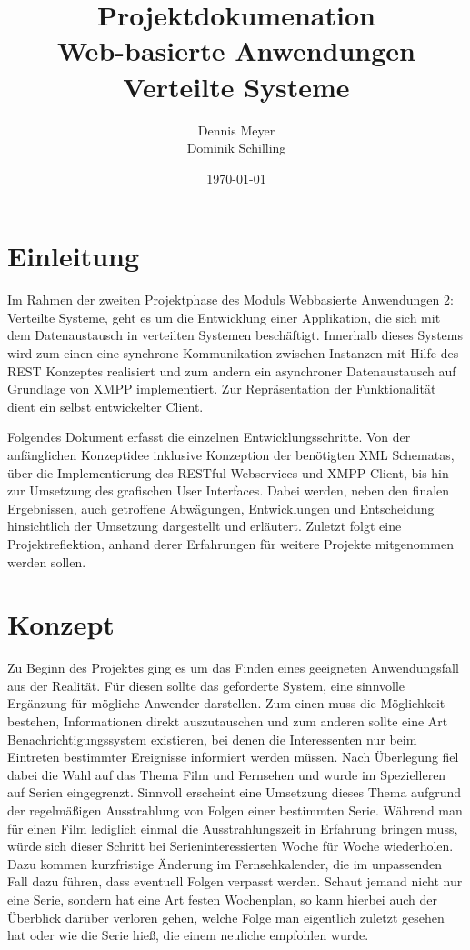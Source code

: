 \documentclass[a4paper]{article}
\title{Projektdokumenation\\Web-basierte Anwendungen\\Verteilte Systeme}
\author{Dennis Meyer\\Dominik Schilling}
\date{\today}
\begin{document}
\maketitle

\newpage

\tableofcontents

\newpage


\section{Einleitung}
Im Rahmen der zweiten Projektphase des Moduls Webbasierte Anwendungen 2: Verteilte Systeme, geht es um die Entwicklung einer Applikation, die sich mit dem Datenaustausch in verteilten Systemen beschäftigt. Innerhalb dieses Systems wird zum einen eine synchrone Kommunikation zwischen Instanzen mit Hilfe des REST Konzeptes realisiert und zum andern ein asynchroner Datenaustausch auf Grundlage von XMPP implementiert. Zur Repräsentation der Funktionalität dient ein selbst entwickelter Client. 

\parskip 12pt
\parindent 0pt
Folgendes Dokument erfasst die einzelnen Entwicklungsschritte. Von der anfänglichen Konzeptidee inklusive Konzeption der benötigten XML Schematas, über die Implementierung des RESTful Webservices und XMPP Client, bis hin zur Umsetzung des grafischen User Interfaces. Dabei werden, neben den finalen Ergebnissen, auch getroffene Abwägungen, Entwicklungen und Entscheidung hinsichtlich der Umsetzung dargestellt und erläutert. 
Zuletzt folgt eine Projektreflektion, anhand derer Erfahrungen für weitere Projekte mitgenommen werden sollen.


\section{Konzept}
Zu Beginn des Projektes ging es um das Finden eines geeigneten Anwendungsfall aus der Realität. Für diesen sollte das geforderte System, eine sinnvolle Ergänzung für mögliche Anwender darstellen.
Zum einen muss die Möglichkeit bestehen, Informationen direkt auszutauschen und zum anderen sollte eine Art Benachrichtigungssystem existieren, bei denen die Interessenten nur beim Eintreten bestimmter Ereignisse informiert werden müssen.
Nach Überlegung fiel dabei die Wahl auf das Thema Film und Fernsehen und wurde im Spezielleren auf Serien eingegrenzt. Sinnvoll erscheint eine Umsetzung dieses Thema aufgrund der regelmäßigen Ausstrahlung von Folgen einer bestimmten Serie.
Während man für einen Film lediglich einmal die Ausstrahlungszeit in Erfahrung bringen muss, würde sich dieser Schritt bei Serieninteressierten Woche für Woche wiederholen. Dazu kommen kurzfristige Änderung im Fernsehkalender, die im unpassenden Fall dazu führen, dass eventuell Folgen verpasst werden. Schaut jemand nicht nur eine Serie, sondern hat eine Art festen Wochenplan, so kann hierbei auch der Überblick darüber verloren gehen, welche Folge man eigentlich zuletzt gesehen hat oder wie die Serie hieß, die einem neuliche empfohlen wurde. 
\end{document}
